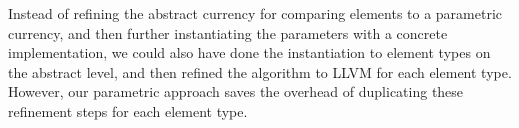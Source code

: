 \documentclass[acmsmall]{acmart}
\begin{document}
  Instead of refining the abstract currency for comparing elements to a parametric currency, and then further instantiating the parameters with a concrete implementation, we could also have done the instantiation to element types on the abstract level, and then refined the algorithm to LLVM for each element type. However, our parametric approach saves the overhead of duplicating these refinement steps for each element type.    


\begin{comment}
Storyline:
  up to now, we assumed costs for a compare are constants.
  That's not always the case, as, e.g., for strings.
  Usually, complexity analysis would count the number of compare operations here.
  With out approach, we can do both, giving an estimate on the number of compare operations,
  and precisely estimating the low-level operations involved in string compare.

  Technical approach:
  from [IJCAR20], our sorting algorithms were already parameterized over an abstract compare function, which then got instantiated for the different data types to be sorted. 
  We extend this concept here, and parameterize with an abstract compare function and its cost.
  
  However, in our case, the cost of the compare function depends on the size of the strings that are compared. We make a worst-case assumption here, and estimate each comparison with the size of the longest string in the array.
  
  An elegant way to integrate this dependent cost into the existing formalization is to amend the refinement relations for the elements by a length bound. This way, the maximum string length can be treated as an arbitrary constant during the refinement proofs, and will only be quantified over in the very last refinement step, when the algorithm is instantiated to the concrete comparison functions. Also, the cost of the comparison function is estimated solely by the length bound, rather then by the actual input, thus avoiding any changes in the existing infrastructure, as the cost still appears to be a constant (depending on the length bound).
  
  To implement strings, we use dynamic arrays REF!, which is close to the implementation of the string datatype in C++ standard libraries (E.g., libstdc++ uses a dynamic array with a special case for short strings).
  
  Discussion:
  In our approach, we have parameterized over the comparison function and its cost, and only instantiated these parameters at the lowest refinement level, i.e., the LLVM code. 
  This approach was motivated by the existing formalization, that also used parameterization.
  

\end{comment}
\end{document}
